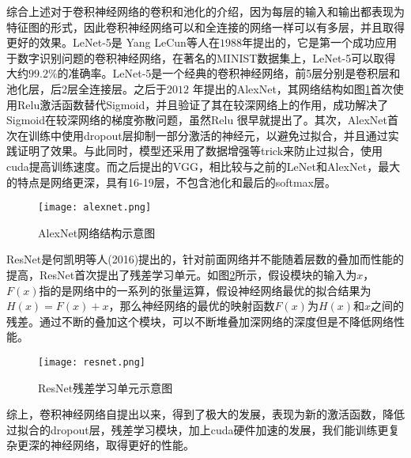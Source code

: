 综合上述对于卷积神经网络的卷积和池化的介绍，因为每层的输入和输出都表现为特征图的形式，因此卷积神经网络可以和全连接的网络一样可以有多层，并且取得更好的效果。LeNet-5\cite{lecun1998gradient-based}是
Yang LeCun等人在$1988$年提出的，它是第一个成功应用于数字识别问题的卷积神经网络，在著名的MINIST数据集上，LeNet-5可以取得大约$99.2\%$的准确率。LeNet-5是一个经典的卷积神经网络，前5层分别是卷积层和池化层，后2层全连接层。之后于$2012$ 年提出的AlexNet\cite{krizhevsky2012imagenet}，其网络结构如图\ref{fig:alexnet-example}首次使用Relu激活函数替代Sigmoid，并且验证了其在较深网络上的作用，成功解决了Sigmoid在较深网络的梯度弥散问题，虽然Relu 很早就提出了。其次，AlexNet首次在训练中使用dropout层抑制一部分激活的神经元，以避免过拟合，并且通过实践证明了效果。与此同时，模型还采用了数据增强等trick来防止过拟合，使用cuda提高训练速度。而之后提出的VGG\cite{simonyan2015very}，相比较与之前的LeNet和AlexNet，最大的特点是网络更深，具有16-19层，不包含池化和最后的softmax层。
\begin{figure}[htpb]
	\centering
	\texttt{[image: alexnet.png]}
    \caption{AlexNet网络结构示意图}
	\vspace*{-3.5mm}
	\label{fig:alexnet-example}
\end{figure}
ResNet\cite{he2016deep}是何凯明等人(2016)提出的，针对前面网络并不能随着层数的叠加而性能的提高，ResNet首次提出了残差学习单元。如图\ref{fig:resnet-example}所示，假设模块的输入为$x$，$F(x)$指的是网络中的一系列的张量运算，假设神经网络最优的拟合结果为$H(x) = F(x) + x$，那么神经网络的最优的映射函数$F(x)$为$H(x)$和$x$之间的残差。通过不断的叠加这个模块，可以不断堆叠加深网络的深度但是不降低网络性能。
\begin{figure}[htpb]
	\centering
	\texttt{[image: resnet.png]}
    \caption{ResNet残差学习单元示意图}
	\vspace*{-3.5mm}
	\label{fig:resnet-example}
\end{figure}

综上，卷积神经网络自提出以来，得到了极大的发展，表现为新的激活函数，降低过拟合的dropout层，残差学习模块，加上cuda硬件加速的发展，我们能训练更复杂更深的神经网络，取得更好的性能。


